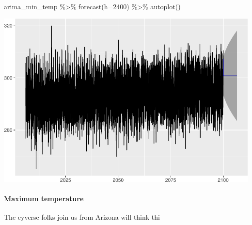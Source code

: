\documentclass[
  paper=a4,
  ,captions=tableheading
]{scrartcl}
\newenvironment{Shaded}{\begin{snugshade}}{\end{snugshade}}
\newcommand{\AttributeTok}[1]{\textcolor[rgb]{0.77,0.63,0.00}{#1}}
\newcommand{\DecValTok}[1]{\textcolor[rgb]{0.00,0.00,0.81}{#1}}
\newcommand{\FunctionTok}[1]{\textcolor[rgb]{0.00,0.00,0.00}{#1}}
\newcommand{\NormalTok}[1]{#1}
\newcommand{\SpecialCharTok}[1]{\textcolor[rgb]{0.00,0.00,0.00}{#1}}
\begin{document}
\begin{Shaded}
\begin{Highlighting}[]
\NormalTok{arima\_min\_temp }\SpecialCharTok{\%\textgreater{}\%} \FunctionTok{forecast}\NormalTok{(}\AttributeTok{h=}\DecValTok{2400}\NormalTok{) }\SpecialCharTok{\%\textgreater{}\%} \FunctionTok{autoplot}\NormalTok{()}
\end{Highlighting}
\end{Shaded}

\includegraphics{Haskell_files/figure-latex/unnamed-chunk-64-1.pdf}

\hypertarget{maximum-temperature}{%
\paragraph{Maximum temperature}\label{maximum-temperature}}

The cyverse folks join us from Arizona will think thi
\end{document}
